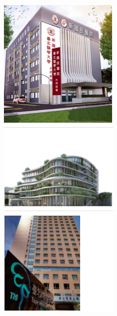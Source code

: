 \documentclass[25pt,a1paper]{tikzposter}
\begin{document}
\begin{columns}
{{\begin{minipage}{0.45\linewidth}
\begin{tikzfigure}[]
    \end{tikzfigure}
\end{minipage}\hfill
\begin{minipage}{0.45\linewidth}
  \centering
    \begin{tikzfigure}[]
    \includegraphics[width=0.6\linewidth]{TMU456.jpg}
    \end{tikzfigure}
\end{minipage}
} %

}
\end{columns}
\end{document}

